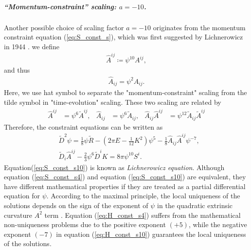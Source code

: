 \subparagraph{“Momentum-constraint” scaling: $a=-10$.}
Another possible choice of scaling factor $a=-10$ originates from the momentum constraint equation (\ref{eq:S_const_s}),
which was first suggested by Lichnerowicz in 1944 \cite{lichnerowicz1944integration}.
we define
\begin{align}
    \hat{A}^{ij} \coloneqq \psi^{10} A^{ij},
\end{align}
and thus
\begin{align}
    \hat{A}_{ij} = \psi^{2} A_{ij}.
\end{align}
Here, we use hat symbol to separate the "momentum-constraint" scaling from the tilde symbol in "time-evolution" scaling.
These two scaling are related by
\begin{align}
    \hat{A}^{ij}&= \psi^6\tilde{A}^{ij}, &\hat{A}_{ij} &= \psi^6 \tilde{A}_{ij}, &\hat{A}_{ij} \hat{A}^{ij} &= \psi^{12} \tilde{A}_{ij} \tilde{A}^{ij}
\end{align}
Therefore, the constraint equations can be written as
\begin{align}
    &\tilde{D}^2 \psi = \frac{1}{8} \psi \tilde{R} - \left( 2\pi E - \frac{1}{12}K^2 \right) \psi^5 - \frac{1}{8} \hat{A}_{ij} \hat{A}^{ij} \psi^{-7}, 
    \label{eq:H_const_s10}\\
    &\tilde{D}_i \hat{A}^{ij} - \frac{2}{3}\psi^6 \tilde{D}^i K = 8\pi \psi^{10} S^i.\label{eq:S_const_s10}
\end{align}
Equation(\ref{eq:S_const_s10}) is known as \textit{Lichnerowicz equation}.
Although equation (\ref{eq:S_const_s4}) and equation (\ref{eq:S_const_s10}) are equivalent,
they have different mathematical properties if they are treated as a partial differential equation for $\psi$.
According to the maximal principle,
the local uniqueness of the solutions depends on the sign of the exponent of $\psi$ in the quadratic extrinsic curvature $A^2$ term 
\cite{cordero2009improved,smarr1979sources,taylor1991partial,evans1997partial,protter2012maximum}.
Equation (\ref{eq:H_const_s4}) suffers from the mathematical non-uniqueness problems due to the positive exponent $(+5)$,
while the negative exponent $(-7)$ in equation (\ref{eq:H_const_s10}) guarantees the local uniqueness of the solutions.

